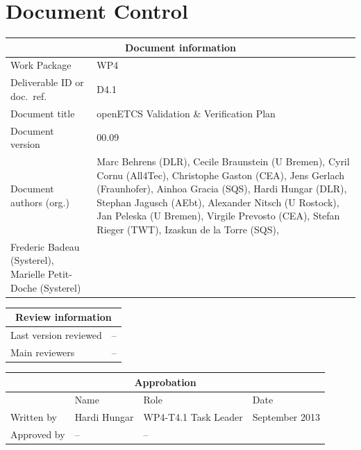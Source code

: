 \documentclass{template/openetcs_report}
\begin{document}
\maketitle
\tableofcontents
\listoffiguresandtables
\newpage

\chapter{Document Control}

\begin{tabular}{|p{4.4cm}|p{8.7cm}|}
  \hline
  \multicolumn{2}{|c|}{Document information} \\
  \hline
  Work Package &  WP4  \\
  Deliverable ID or doc.\ ref.\ & D4.1\\
  \hline
  Document title & openETCS Validation \& Verification Plan\\
  Document version & 00.09 \\
  Document authors (org.)  &  Marc Behrens (DLR),
  Cecile Braunstein (U Bremen), Cyril Cornu (All4Tec), Christophe
  Gaston (CEA), Jens Gerlach 
  (Fraunhofer), Ainhoa Gracia (SQS), Hardi Hungar (DLR), Stephan Jagusch
  (AEbt), Alexander Nitsch (U Rostock), Jan Peleska (U Bremen),
  Virgile Prevosto (CEA),
  Stefan Rieger (TWT), Izaskun de la Torre (SQS),\\
  Frederic Badeau (Systerel), Marielle Petit-Doche (Systerel)\\
  \hline
\end{tabular}

\begin{tabular}{|p{4.4cm}|p{8.7cm}|}
\hline
\multicolumn{2}{|c|}{Review information} \\
\hline
Last version reviewed & -- \\
\hline
Main reviewers & -- \\
\hline
\end{tabular}

\begin{tabular}{|p{2.2cm}|p{4cm}|p{4cm}|p{2cm}|}
\hline
\multicolumn{4}{|c|}{Approbation} \\
\hline
  &  Name & Role & Date   \\
\hline  
Written by    &  Hardi Hungar & WP4-T4.1 Task Leader  & September 2013\\
\hline
Approved by & -- & -- & \\
\hline
\end{tabular}
\end{document}
